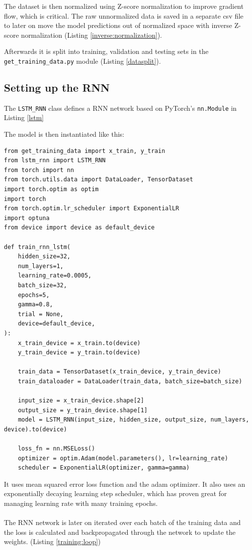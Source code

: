 \documentclass[11pt]{article}
\begin{document}
The dataset is then normalized using Z-score normalization to improve gradient flow, which is critical. The raw unnormalized data is saved in a separate csv file to later on move the model predictions out of normalized space with inverse Z-score normalization (Listing \ref{inverse:normalization}).


Afterwards it is split into training, validation and testing sets in the \texttt{get\_training\_data.py} module (Listing \ref{datasplit}).

\subsection{Setting up the RNN}

The \texttt{LSTM\_RNN} class defines a RNN network based on PyTorch's \texttt{nn.Module} in Listing \ref{lstm}


The model is then instantiated like this:
\begin{lstlisting}
from get_training_data import x_train, y_train
from lstm_rnn import LSTM_RNN
from torch import nn
from torch.utils.data import DataLoader, TensorDataset
import torch.optim as optim
import torch
from torch.optim.lr_scheduler import ExponentialLR
import optuna
from device import device as default_device

def train_rnn_lstm(
    hidden_size=32,
    num_layers=1,
    learning_rate=0.0005,
    batch_size=32,
    epochs=5,
    gamma=0.8,
    trial = None,
    device=default_device,
):
    x_train_device = x_train.to(device)
    y_train_device = y_train.to(device)

    train_data = TensorDataset(x_train_device, y_train_device)
    train_dataloader = DataLoader(train_data, batch_size=batch_size)

    input_size = x_train_device.shape[2]
    output_size = y_train_device.shape[1]
    model = LSTM_RNN(input_size, hidden_size, output_size, num_layers, device).to(device)

    loss_fn = nn.MSELoss()
    optimizer = optim.Adam(model.parameters(), lr=learning_rate)
    scheduler = ExponentialLR(optimizer, gamma=gamma)
\end{lstlisting}

 It uses mean squared error loss function and the adam optimizer. It also uses an exponentially decaying learning step scheduler, which has proven great for managing learning rate with many training epochs. \\ \\  The RNN network is later on iterated over each batch of the training data and the loss is calculated and backpropagated through the network to update the weights. (Listing \ref{training:loop})
\end{document}
